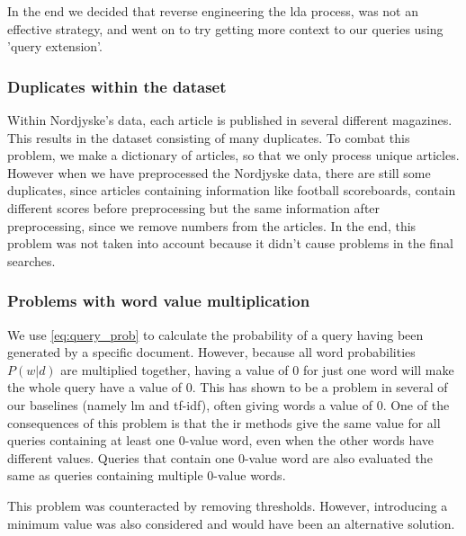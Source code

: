 In the end we decided that reverse engineering the \gls{lda} process, was not an effective strategy, and went on to try getting more context to our queries using 'query extension'.


\subsubsection{Duplicates within the dataset}
Within Nordjyske's data, each article is published in several different magazines. 
This results in the dataset consisting of many duplicates. 
To combat this problem, we make a dictionary of articles, so that we only process unique articles.
However when we have preprocessed the Nordjyske data, there are still some duplicates, since articles containing information like football scoreboards, contain different scores before preprocessing but the same information after preprocessing, since we remove numbers from the articles.
In the end, this problem was not taken into account because it didn't cause problems in the final searches.


\subsubsection{Problems with word value multiplication}
We use \autoref{eq:query_prob} to calculate the probability of a query having been generated by a specific document. 
However, because all word probabilities $P(w|d)$ are multiplied together, having a value of 0 for just one word will make the whole query have a value of 0.
This has shown to be a problem in several of our baselines (namely \gls{lm} and \gls{tf-idf}), often giving words a value of 0.
One of the consequences of this problem is that the \gls{ir} methods give the same value for all queries containing at least one 0-value word, even when the other words have different values. 
Queries that contain one 0-value word are also evaluated the same as queries containing multiple 0-value words.

This problem was counteracted by removing thresholds.
However, introducing a minimum value was also considered and would have been an alternative solution.
